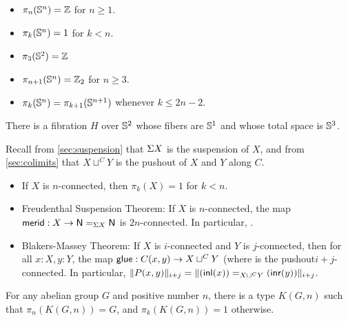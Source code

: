 \begin{thm} \mbox{}
\begin{itemize}
\item $\pi_n(\Sn ^n) = \mathbb{Z}$ for $n \ge 1$.
\item $\pi_k(\Sn ^n) = 1$ for $k < n$.  
\item $\pi_3(\Sn ^2) = \mathbb{Z}$
\item $\pi_{n+1}(\Sn ^n) = \mathbb{Z}_2$ for $n \ge 3$.    
\item $\pi_k(\Sn ^n) = \pi_{k+1}(\Sn ^{n+1})$ whenever $k \le 2n - 2$.  
\end{itemize}
\end{thm}

\begin{thm}
There is a fibration $H$ over $\Sn ^2$ whose fibers are $\Sn ^1$ and
whose total space is $\Sn ^3$.  
\end{thm}

\begin{thm} \mbox{}
Recall from \autoref{sec:suspension} that $\susp X$ is the
suspension of $X$, and from \autoref{sec:colimits} that $X \sqcup^C
Y$ is the pushout of $X$ and $Y$ along $C$.

\begin{itemize}
\item If $X$ is $n$-connected, then $\pi_k(X) = 1$ for $k < n$.  

\item Freudenthal Suspension Theorem: 
  If $X$ is $n$-connected, the map $\merid : X \rightarrow \id[\susp X]
  \north \north$ is $2n$-connected.  In particular,
  .

\item Blakers-Massey Theorem: If $X$ is $i$-connected and $Y$ is
  $j$-connected, then for all $x:X,y:Y$, the map $\glue : C(x,y)
  \rightarrow X \sqcup^C Y$ (where is the pushout$i+j$-connected.  In
  particular, $\trunc {i+j} {P(x,y)} = \trunc {i+j} {\id [X \sqcup^C Y]
    {(\inl(x))} {(\inr(y))}}$.
\end{itemize}
\end{thm}

\begin{thm}
For any abelian group $G$ and positive number $n$, there is a type
$K(G,n)$ such that $\pi_n(K(G,n)) = G$, and  $\pi_k(K(G,n)) = 1$
otherwise.  
\end{thm}

